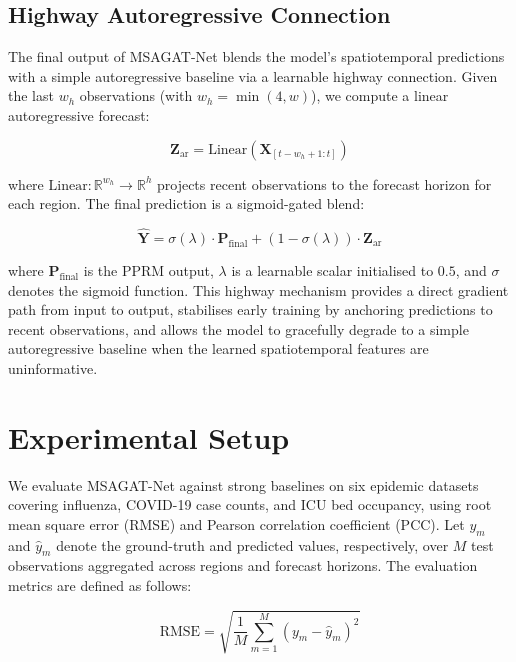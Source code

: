 \documentclass[final,1p,times]{elsarticle}
\begin{document}
\subsection{Highway Autoregressive Connection}

The final output of MSAGAT-Net blends the model's spatiotemporal predictions with a simple autoregressive baseline via a learnable highway connection. Given the last $w_h$ observations (with $w_h = \min(4, w)$), we compute a linear autoregressive forecast:

\begin{equation}
\mathbf{Z}_{\text{ar}} = \text{Linear}(\mathbf{X}_{[t-w_h+1:t]})
\end{equation}

where $\text{Linear}: \mathbb{R}^{w_h} \to \mathbb{R}^{h}$ projects recent observations to the forecast horizon for each region. The final prediction is a sigmoid-gated blend:

\begin{equation}
\hat{\mathbf{Y}} = \sigma(\lambda) \cdot \mathbf{P}_{\text{final}} + (1 - \sigma(\lambda)) \cdot \mathbf{Z}_{\text{ar}}
\end{equation}

where $\mathbf{P}_{\text{final}}$ is the PPRM output, $\lambda$ is a learnable scalar initialised to $0.5$, and $\sigma$ denotes the sigmoid function. This highway mechanism provides a direct gradient path from input to output, stabilises early training by anchoring predictions to recent observations, and allows the model to gracefully degrade to a simple autoregressive baseline when the learned spatiotemporal features are uninformative.

\section{Experimental Setup}
\label{sec:experiments}

We evaluate MSAGAT-Net against strong baselines on six epidemic datasets covering influenza, COVID-19 case counts, and ICU bed occupancy, using root mean square error (RMSE) and Pearson correlation coefficient (PCC). Let $y_m$ and $\hat{y}_m$ denote the ground-truth and predicted values, respectively, over $M$ test observations aggregated across regions and forecast horizons. The evaluation metrics are defined as follows:

\begin{equation}
\mathrm{RMSE} = \sqrt{\frac{1}{M} \sum_{m=1}^{M} (y_m - \hat{y}_m)^2}
\end{equation}
\end{document}
